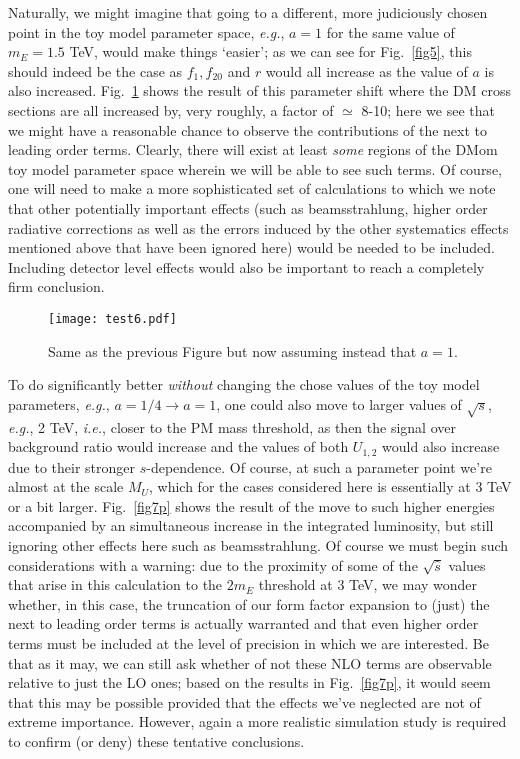 \documentclass[14pt]{article}
\def\ie{{\it i.e.}}
\def\eg{{\it e.g.}}
\def\to{\rightarrow}
\begin{document}
{Naturally, we might imagine that going to a different, more judiciously chosen point in the toy model parameter space, \eg, $a=1$ for the same value of $m_E=1.5$ TeV, would make things `easier'; 
as we can see for Fig.~\ref{fig5}, this should indeed be the case as $f_1, f_{20}$ and $r$ would all increase as the value of $a$ is also increased. Fig.~\ref{fig7pp} shows the result of this parameter shift 
where the DM cross sections are all increased by, very roughly, a factor of $\simeq$ 8-10; here we see that we might have a reasonable chance to observe the contributions of the next to leading 
order terms. Clearly, there will exist at least {\it some} regions of the DMom toy model parameter space wherein we will be able to see such terms. Of course, one will need to make a more sophisticated 
set of calculations to which we note that other potentially important effects (such as beamsstrahlung, higher order radiative corrections as well as the errors induced by the other systematics effects 
mentioned above that have been ignored here) would be needed to be included. Including detector level effects would also be important to reach a completely firm conclusion.

%
\begin{figure}[htbp]
\centerline{\texttt{[image: test6.pdf]}}
\vspace*{-1.3cm}
\caption{Same as the previous Figure but now assuming instead that $a=1$.}
\label{fig7pp}
\end{figure}
%

To do significantly better {\it without} changing the chose values of the toy model parameters, \eg, $a=1/4 \to a=1$, one could also move to larger values of $\sqrt s$, \eg, 2 TeV, \ie, closer to the PM 
mass threshold, as then the signal over background ratio would increase and the values of both $U_{1,2}$ would also increase due to their stronger $s$-dependence.  Of course, at such a parameter 
point we're almost at the scale $M_U$, which for the cases considered here is essentially at 3 TeV or a bit 
larger.  Fig.~\ref{fig7p} shows the result of the move to such higher energies accompanied by an simultaneous increase in the integrated luminosity, but still ignoring other effects here such as 
beamsstrahlung. Of course we must begin such considerations with a warning:  due to the proximity of some of the $\sqrt {\hat s}$ values that arise in this calculation to the $2m_E$ threshold at 3 TeV, 
we may wonder whether, in this case, the truncation of our form factor expansion to (just) the next to leading order terms is actually warranted and that even higher order terms must be included at 
the level of precision in which we are interested. Be that as it may, we can still ask whether of not these NLO terms are observable relative to just the LO ones; based on the results in Fig.~\ref{fig7p}, 
it would seem that this may be possible provided that the effects we've neglected are not of extreme importance. However, again 
a more realistic simulation study is required to confirm (or deny) these tentative 
conclusions.

}
\end{document}
